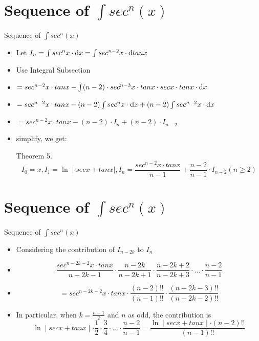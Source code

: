 \documentclass[11pt, thmnum, eqsecnum, allcites, dark]{mathbeamer}
\begin{document}
\section{Sequence of $\int sec^n(x)$}
\begin{frame}{Sequence of $\int sec^n(x)$}
\begin{itemize}[<+->]
\item Let $I_n = \int sec^nx \cdot {\rm d}x = \int sec^{n-2}x \cdot {\rm d}tanx$
\item Use Integral Subsection
\item $ = sec^{n-2}x \cdot tanx - \int (n-2) \cdot sec^{n-3}x \cdot tanx \cdot secx \cdot tanx \cdot {\rm d}x$
\item $ = sec^{n-2}x \cdot tanx - (n-2) \int sec^{n}x \cdot {\rm d}x + (n-2) \int sec^{n-2}x \cdot {\rm d}x$
\item $ = sec^{n-2}x \cdot tanx - (n-2) \cdot I_n + (n-2)  \cdot I_{n-2} $
\item simplify, we get:
  \begin{block}{Theorem 5.}
 $$I_0 = x, I_1 = \ln \mid secx + tanx \mid , I_n = \frac{sec^{n-2}x \cdot tanx}{n-1} + \frac{n-2}{n-1} \cdot I_{n-2} (n \geq 2)$$
  \end{block}
\end{itemize}
\end{frame}

\section{Sequence of $\int sec^n(x)$}
\begin{frame}{Sequence of $\int sec^n(x)$}
\begin{itemize}[<+->]
  \begin{block}{Theorem 5.}
 $$I_0 = x, I_1 = \ln \mid secx + tanx \mid , I_n = \frac{sec^{n-2}x \cdot tanx}{n-1} + \frac{n-2}{n-1} \cdot I_{n-2} (n \geq 2)$$
  \end{block}
\item Considering the contribution of $I_{n-2k}$ to $I_n$
\item $$\frac{sec^{n-2k-2}x \cdot tanx}{n-2k-1} \cdot \frac{n-2k}{n-2k+1} \cdot \frac{n-2k+2}{n-2k+3} \cdot \ldots \cdot \frac{n-2}{n-1}$$
\item $$=sec^{n-2k-2}x \cdot tanx \cdot \frac{(n-2)!!}{(n-1)!!} \cdot \frac{(n-2k-3)!!}{(n-2k-2)!!}$$
\item In particular, when $k=\frac{n-1}{2}$ and $n$ as odd, the contribution is $$\ln \mid secx + tanx \mid \cdot \frac{1}{2} \cdot \frac{3}{4} \cdot \ldots \cdot\frac{n-2}{n-1} = \frac{\ln \mid secx + tanx \mid \cdot (n-2)!!}{(n-1)!!} $$
\end{itemize}
\end{frame}
\end{document}
